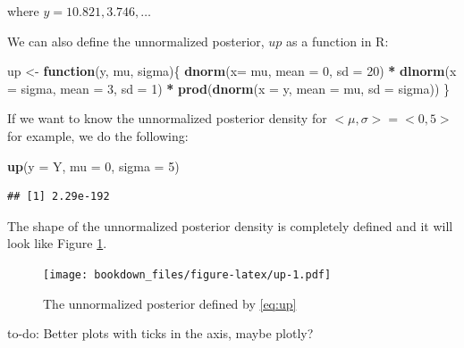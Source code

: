 \documentclass[12pt,]{krantz}
\makeatletter
\newenvironment{Shaded}{\begin{snugshade}}{\end{snugshade}}
\newcommand{\ControlFlowTok}[1]{\textcolor[rgb]{0.13,0.29,0.53}{\textbf{#1}}}
\newcommand{\DataTypeTok}[1]{\textcolor[rgb]{0.13,0.29,0.53}{#1}}
\newcommand{\DecValTok}[1]{\textcolor[rgb]{0.00,0.00,0.81}{#1}}
\newcommand{\KeywordTok}[1]{\textcolor[rgb]{0.13,0.29,0.53}{\textbf{#1}}}
\newcommand{\NormalTok}[1]{#1}
\newcommand{\OperatorTok}[1]{\textcolor[rgb]{0.81,0.36,0.00}{\textbf{#1}}}
\newcommand{\StringTok}[1]{\textcolor[rgb]{0.31,0.60,0.02}{#1}}
\newenvironment{kframe}{%
\medskip{}
\setlength{\fboxsep}{.8em}
 \def\at@end@of@kframe{}%
 \ifinner\ifhmode%
  \def\at@end@of@kframe{\end{minipage}}%
  \begin{minipage}{\columnwidth}%
 \fi\fi%
 \def\FrameCommand##1{\hskip\@totalleftmargin \hskip-\fboxsep
 \colorbox{shadecolor}{##1}\hskip-\fboxsep
     \hskip-\linewidth \hskip-\@totalleftmargin \hskip\columnwidth}%
 \MakeFramed {\advance\hsize-\width
   \@totalleftmargin\z@ \linewidth\hsize
   \@setminipage}}%
 {\par\unskip\endMakeFramed%
 \at@end@of@kframe}
\newenvironment{rmdblock}[1]
  {
  \begin{itemize}
  \renewcommand{\labelitemi}{
    \raisebox{-.7\height}[0pt][0pt]{
      {\setkeys{Gin}{width=3em,keepaspectratio}\texttt{[image: images/\#1]}}
    }
  }
  \setlength{\fboxsep}{1em}
  \begin{kframe}
  \item
  }
  {
  \end{kframe}
  \end{itemize}
  }
\newenvironment{rmdnote}
  {\begin{rmdblock}{note}}
  {\end{rmdblock}}
\theoremstyle{definition}
\theoremstyle{definition}
\theoremstyle{definition}
\theoremstyle{remark}
\makeatother
\begin{document}
where \(y = {10.821, 3.746, \ldots}\)

We can also define the unnormalized posterior, \(up\) as a function in R:

\begin{Shaded}
\begin{Highlighting}[]
\NormalTok{up <-}\StringTok{ }\ControlFlowTok{function}\NormalTok{(y, mu, sigma)\{}
  \KeywordTok{dnorm}\NormalTok{(}\DataTypeTok{x=}\NormalTok{ mu, }\DataTypeTok{mean =} \DecValTok{0}\NormalTok{, }\DataTypeTok{sd =} \DecValTok{20}\NormalTok{) }\OperatorTok{*}
\StringTok{    }\KeywordTok{dlnorm}\NormalTok{(}\DataTypeTok{x =}\NormalTok{ sigma, }\DataTypeTok{mean =} \DecValTok{3}\NormalTok{, }\DataTypeTok{sd =} \DecValTok{1}\NormalTok{) }\OperatorTok{*}
\StringTok{    }\KeywordTok{prod}\NormalTok{(}\KeywordTok{dnorm}\NormalTok{(}\DataTypeTok{x =}\NormalTok{ y, }\DataTypeTok{mean =}\NormalTok{ mu, }\DataTypeTok{sd =}\NormalTok{ sigma))}
\NormalTok{\}}
\end{Highlighting}
\end{Shaded}

If we want to know the unnormalized posterior density for \(<\mu,\sigma> = <0, 5>\) for example, we do the following:

\begin{Shaded}
\begin{Highlighting}[]
\KeywordTok{up}\NormalTok{(}\DataTypeTok{y =}\NormalTok{ Y, }\DataTypeTok{mu =} \DecValTok{0}\NormalTok{, }\DataTypeTok{sigma =} \DecValTok{5}\NormalTok{)}
\end{Highlighting}
\end{Shaded}

\begin{verbatim}
## [1] 2.29e-192
\end{verbatim}

The shape of the unnormalized posterior density is completely defined and it will look like Figure \ref{fig:up}.



\begin{figure}
\centering
\texttt{[image: bookdown\_files/figure-latex/up-1.pdf]}
\caption{\label{fig:up}The unnormalized posterior defined by \eqref{eq:up}}
\end{figure}

\begin{rmdnote}
to-do: Better plots with ticks in the axis, maybe plotly?
\end{rmdnote}
\end{document}
